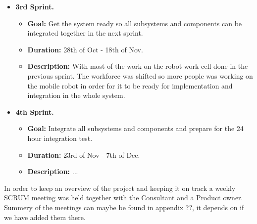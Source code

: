 \begin{itemize}
    \item \textbf{3rd Sprint.}
    \begin{itemize}
    	\item \textbf{Goal:} Get the system ready so all subsystems and components can be integrated together in the next sprint.
    	\item \textbf{Duration:} 28th of Oct - 18th of Nov.
    	\item \textbf{Description:} With most of the work on the robot work cell done in the previous sprint. The workforce was shifted so more people was working on the mobile robot in order for it to be ready for implementation and integration in the whole system.
	\end{itemize}
	
    \item \textbf{4th Sprint.}
    \begin{itemize}
    	\item \textbf{Goal:} Integrate all subsystems and components and prepare for the 24 hour integration test.
    	\item \textbf{Duration:} 23rd of Nov - 7th of Dec.
    	\item \textbf{Description:} ...
	\end{itemize}
\end{itemize}

In order to keep an overview of the project and keeping it on track a weekly SCRUM meeting was held together with the Consultant and a Product owner. Summery of the meetings can maybe be found in appendix ??, it depends on if we have added them there.




